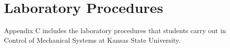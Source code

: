 
\cleardoublepage

\chapter{Laboratory Procedures}

Appendix C includes the laboratory procedures that students carry out in Control of Mechanical Systems at Kansas State University.

\label{Appendix:Key3}


	
	

